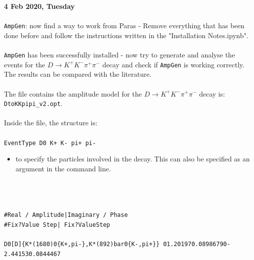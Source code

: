 \noindent\textbf{4 Feb 2020, Tuesday}
\\
\\
\texttt{AmpGen}: now find a way to work from Paras - Remove everything that has been done before and follow the instructions written in the "Installation Notes.ipynb".
\\
\\
\texttt{AmpGen} has been successfully installed - now try to generate and analyse the events for the $D\to K^+K^-\pi^+\pi^-$ decay and check if \texttt{AmpGen} is working correctly.
The results can be compared with the literature\autocite{Aaij_2014}.
\\
\\
The file contains the amplitude model for the $D\to K^+K^-\pi^+\pi^-$ decay is: \texttt{DtoKKpipi\_v2.opt}. 
\\
\\
Inside the file, the structure is:
\\
\\
\texttt{EventType D0 K+ K- pi+ pi-} 
\begin{itemize}
    \item to specify the particles involved in the decay. This can also be specified as an argument in the command line.
\end{itemize}
\\
\\
\\
\footnotesize
\texttt{\#\hspace{9cm}Real / Amplitude\hspace{0.2cm}|\hspace{0.2cm}Imaginary / Phase}
\\
\texttt{\#\hspace{9cm}Fix?\hspace{0.2cm}Value\hspace{0.2cm}  Step\hspace{0.2cm}|\hspace{0.2cm} Fix?\hspace{0.2cm}Value\hspace{0.2cm}Step}
\\
\\
\texttt{D0[D]\{K*(1680)0\{K+,pi-\},K*(892)bar0\{K-,pi+\}\}	        \hspace{0.2cm}0\hspace{0.2cm}1.20197\hspace{0.2cm}0.0898679\hspace{0.2cm}0\hspace{0.2cm}-2.44153\hspace{0.2cm}0.0844467}

